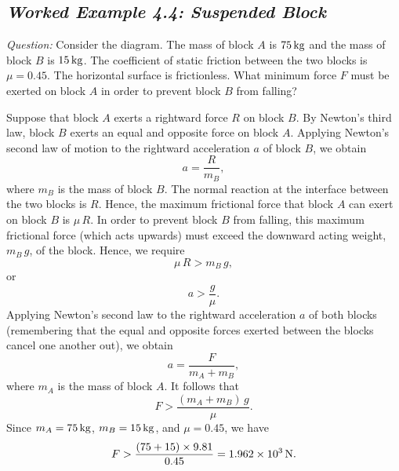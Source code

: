 \subsection*{\em Worked Example 4.4: Suspended Block}
{\em Question:} Consider the diagram. The mass of block $A$ is $75\,{\rm kg}$ and
the mass of block $B$ is $15\,{\rm kg}$. The coefficient of static friction
between the two blocks is $\mu = 0.45$. The horizontal surface is frictionless. What 
minimum force
$F$ must be exerted on block $A$ in order to prevent block $B$ from
falling?

\begin{figure*}[h]
\epsfysize=1.5in
\centerline{}
\end{figure*}

 Suppose that block $A$ exerts a rightward force $R$
on block $B$. By Newton's third law, block $B$ exerts an equal and opposite force
on block $A$. Applying Newton's second law of motion to the rightward
acceleration $a$ of block $B$, we obtain
$$
a = \frac{R}{m_B},
$$
where $m_B$ is the mass of block $B$. The normal reaction at the interface between
the two blocks is $R$. Hence, the maximum frictional force that block $A$
can exert on block $B$ is $\mu\,R$. In order to prevent block $B$ from falling,
this maximum frictional force (which acts upwards) must exceed the downward acting weight, $m_B\, g$,
of the block. Hence, we require
$$
\mu\,R > m_B\,g,
$$
or 
$$
a > \frac{g}{\mu}.
$$
Applying Newton's second law to the rightward acceleration $a$ of both blocks (remembering that the
equal and opposite forces exerted between the blocks cancel one another out), we obtain
$$
a = \frac{F}{m_A+m_B},
$$
where $m_A$ is the mass of block $A$. It follows that
$$
F > \frac{(m_A+m_B)\,g}{\mu}.
$$
Since $m_A=75\,{\rm kg}$, $m_B = 15\,{\rm kg}$, and $\mu= 0.45$, we have
$$
F > \frac{(75+15)\times 9.81}{0.45} = 1.962\times 10^3\,{\rm N}.
$$
